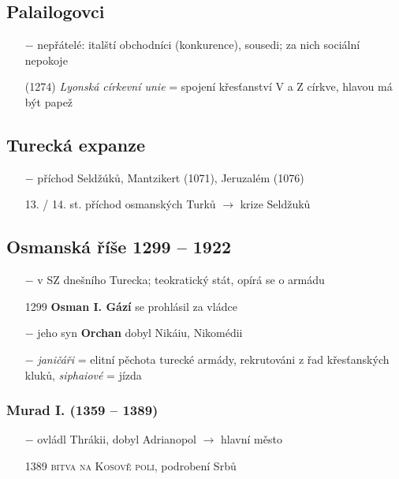 \documentclass{article}
\begin{document}
\subsection*{Palailogovci}
\begin{itemize}
    \vspace{-0.5em}
    \setlength\itemsep{0.15em}
    \item[$-$] nepřátelé: italští obchodníci (konkurence), sousedi; za nich sociální nepokoje
    \item[(1274)] \textit{Lyonská církevní unie} = spojení křesťanství V a Z církve, hlavou má být papež
\end{itemize}


\subsection*{Turecká expanze}
\begin{itemize}
    \vspace{-0.5em}
    \setlength\itemsep{0.15em}
    \item[$-$] příchod Seldžúků, Mantzikert (1071), Jeruzalém (1076)
    \item[13. / 14. st.] příchod osmanských Turků $\rightarrow$ krize Seldžuků
\end{itemize}


\subsection*{Osmanská říše 1299 -- 1922}
\begin{itemize}
    \vspace{-0.5em}
    \setlength\itemsep{0.15em}
    \item[$-$] v SZ dnešního Turecka; teokratický stát, opírá se o armádu
    \item[1299] \textbf{Osman I. Gází} se prohlásil za vládce
    \item[$-$] jeho syn \textbf{Orchan} dobyl Nikáiu, Nikomédii
    \item[$-$] \textit{janičáři} = elitní pěchota turecké armády, rekrutováni z řad křesťanských kluků, \textit{siphaiové} = jízda
\end{itemize}

\subsubsection*{Murad I. (1359 -- 1389)}
\begin{itemize}
    \vspace{-0.5em}
    \setlength\itemsep{0.15em}
    \item[$-$] ovládl Thrákii, dobyl Adrianopol $\rightarrow$ hlavní město
    \item[1389] \textsc{bitva na Kosově poli}, podrobení Srbů
\end{itemize}
\end{document}
